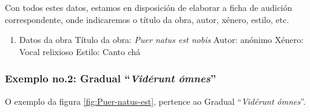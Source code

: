\documentclass[spanish, a4paper,nobind]{templates/ociamthesis}
\providecommand{\tightlist}{%
  \setlength{\itemsep}{0pt}\setlength{\parskip}{0pt}}
\begin{document}
Con todos estes datos, estamos en disposición de elaborar a ficha de audición correspondente, onde indicaremos o título da obra, autor, xénero, estilo, etc.

\begin{enumerate}
\def\labelenumi{\arabic{enumi}.}
\setcounter{enumi}{6}
\tightlist
\item
  Datos da obra
  Título da obra: \emph{Puer natus est nobis}
  Autor: anónimo
  Xénero: Vocal relixioso
  Estilo: Canto chá
\end{enumerate}

\hypertarget{exemplo-no.2-gradual-viduxe9runt-uxf3mnes}{%
\subsubsection*{\texorpdfstring{Exemplo no.2: Gradual ``\emph{Vidérunt ómnes}''}{Exemplo no.2: Gradual ``Vidérunt ómnes''}}\label{exemplo-no.2-gradual-viduxe9runt-uxf3mnes}}

O exemplo da figura \ref{fig:Puer-natus-est}, pertence ao Gradual ``\emph{Vidérunt ómnes}''.
\end{document}
